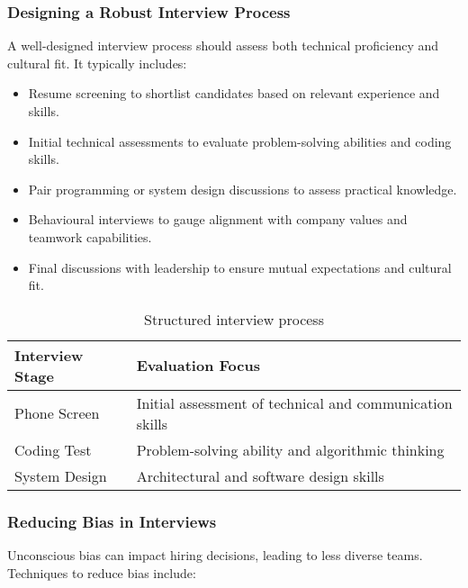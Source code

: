 \subsubsection{Designing a Robust Interview Process}

A well-designed interview process should assess both technical proficiency and cultural fit. It typically includes:

\begin{itemize}
    \item Resume screening to shortlist candidates based on relevant experience and skills.
    \item Initial technical assessments to evaluate problem-solving abilities and coding skills.
    \item Pair programming or system design discussions to assess practical knowledge.
    \item Behavioural interviews to gauge alignment with company values and teamwork capabilities.
    \item Final discussions with leadership to ensure mutual expectations and cultural fit.
\end{itemize}

\begin{table}[h]
    \centering
    \begin{tabular}{|l|l|}
        \hline
        \textbf{Interview Stage} & \textbf{Evaluation Focus}                                \\
        \hline
        Phone Screen             & Initial assessment of technical and communication skills \\
        \hline
        Coding Test              & Problem-solving ability and algorithmic thinking         \\
        \hline
        System Design            & Architectural and software design skills                 \\
        \hline
    \end{tabular}
    \caption{Structured interview process}
    \label{tab:interviewprocess}
\end{table}

\subsubsection{Reducing Bias in Interviews}

Unconscious bias can impact hiring decisions, leading to less diverse teams. Techniques to reduce bias include:

